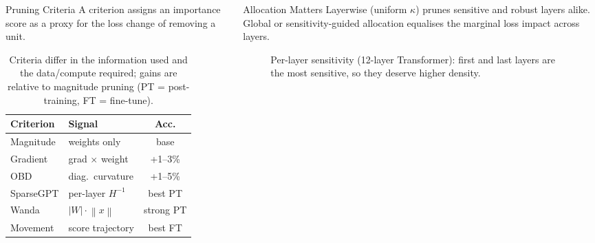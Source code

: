\documentclass[final]{beamer}
\newlength{\onecolwid}
\newlength{\twocolwid}
\newcommand{\norm}[1]{\left\lVert #1 \right\rVert}
\begin{document}
\begin{frame}[t]
\begin{columns}[t]
\begin{column}{\twocolwid}
\begin{columns}[t,totalwidth=\twocolwid]
\begin{column}{\onecolwid}
\begin{block}{Pruning Criteria}
A criterion assigns an importance score as a proxy for the loss change of
removing a unit.
\begin{table}
\renewcommand{\arraystretch}{1.25}
\small
\begin{tabularx}{\linewidth}{lXc}
\toprule
\textbf{Criterion} & \textbf{Signal} & \textbf{Acc.} \\
\midrule
Magnitude & weights only & base \\
Gradient & grad $\times$ weight & +1--3\% \\
OBD & diag.\ curvature & +1--5\% \\
SparseGPT & per-layer $H^{-1}$ & best PT \\
Wanda & $|W|\!\cdot\!\norm{x}$ & strong PT \\
Movement & score trajectory & best FT \\
\bottomrule
\end{tabularx}
\caption{Criteria differ in the information used and the data/compute required;
gains are relative to magnitude pruning (PT = post-training, FT = fine-tune).}
\end{table}
\end{block}
\end{column}

\begin{column}{\onecolwid}
\begin{block}{Allocation Matters}
Layerwise (uniform $\kappa$) prunes sensitive and robust layers alike. Global
or sensitivity-guided allocation equalises the marginal loss impact across
layers.
\begin{figure}
\caption{Per-layer sensitivity (12-layer Transformer): first and last layers
are the most sensitive, so they deserve higher density.}
\end{figure}
\end{block}
\end{column}


\end{columns}
\end{column}
\end{columns}
\end{frame}
\end{document}
